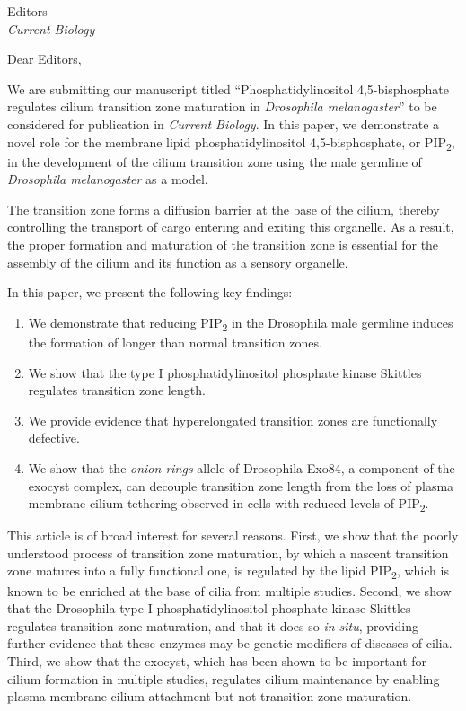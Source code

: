 \documentclass[12pt, twoside, letterpaper]{letter}
\date{\small \today}
\newcommand{\PIP}{PIP\textsubscript{2}}
\begin{document}
\begin{letter}{Editors \\
    \textit{Current Biology}}

\opening{Dear Editors,}

We are submitting our manuscript titled
``Phosphatidylinositol 4,5-bisphosphate regulates
cilium transition zone maturation in \textit{Drosophila melanogaster}''
to be considered for publication in \textit{Current Biology}.
In this paper, we demonstrate a novel role for the membrane lipid
phosphatidylinositol 4,5-bisphosphate, or \PIP{},
in the development of the cilium transition zone using
the male germline of \textit{Drosophila melanogaster} as a model.

The transition zone forms a diffusion barrier
at the base of the cilium, thereby controlling
the transport of cargo entering and exiting this organelle.
As a result, the proper formation and maturation of the transition zone
is essential for the assembly of the cilium
and its function as a sensory organelle.

In this paper, we present the following key findings:
\begin{enumerate}
\item We demonstrate that reducing \PIP{} in the Drosophila male germline
  induces the formation of longer than normal transition zones.
\item We show that the type I phosphatidylinositol phosphate kinase
  Skittles regulates transition zone length.
\item We provide evidence that hyperelongated transition zones are
  functionally defective.
\item We show that the \textit{onion rings} allele of Drosophila Exo84,
  a component of the exocyst complex, can decouple transition zone length
  from the loss of plasma membrane-cilium tethering observed in cells
  with reduced levels of \PIP{}.
\end{enumerate}

This article is of broad interest for several reasons.
First, we show that the poorly understood process of
transition zone maturation, by which a nascent transition zone
matures into a fully functional one,
is regulated by the lipid \PIP{}, which is known to be enriched
at the base of cilia from multiple studies.
Second, we show that the Drosophila type I phosphatidylinositol
phosphate kinase Skittles regulates transition zone
maturation, and that it does so \textit{in situ},
providing further evidence that these enzymes may be genetic
modifiers of diseases of cilia.
Third, we show that the exocyst, which has been shown to be important for
cilium formation in multiple studies, regulates cilium maintenance
by enabling plasma membrane-cilium attachment but not transition zone maturation.


\end{letter}
\end{document}
